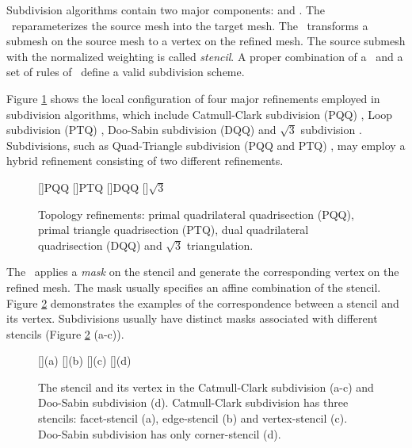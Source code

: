 Subdivision algorithms contain two major
components: \emph{\tr} and \emph{\gm}.
The \tr\ reparameterizes the source mesh into the target 
mesh. The \gm\ transforms a submesh on the source mesh
to a vertex on the refined mesh. The source submesh with
the normalized weighting is called 
\emph{stencil}. A proper combination of a \tr\ and a set of 
rules of \gm\ define a valid subdivision scheme.

Figure \ref{fig:RefSchemes} shows the local configuration 
of four major refinements
employed in subdivision algorithms, which include Catmull-Clark
subdivision (PQQ) \cite{cc}, Loop subdivision (PTQ) \cite{loop},
Doo-Sabin subdivision (DQQ) \cite{ds} and $\sqrt{3}$ subdivision
\cite{sqrt3}. Subdivisions, such as Quad-Triangle subdivision (PQQ and
PTQ) \cite{qts,l-pg-03}, may employ a hybrid refinement consisting
of two different refinements.
\begin{figure}
  \centering
  []{\scriptsize PQQ} 
  []{\scriptsize PTQ}
  []{\scriptsize DQQ} 
  []{\scriptsize $\sqrt{3}$} 
  \caption{Topology refinements: 
    primal quadrilateral quadrisection (PQQ),
    primal triangle quadrisection (PTQ),
    dual quadrilateral quadrisection (DQQ) and
    $\sqrt{3}$ triangulation.}
  \label{fig:RefSchemes}
\end{figure}
The \gm\ applies a \emph{mask} on the stencil and
generate the corresponding vertex on the refined mesh.
The mask usually specifies an affine combination of the 
stencil. Figure \ref{fig:RefMap} demonstrates the examples of the
correspondence between a stencil and its vertex. Subdivisions 
usually have distinct masks associated with different stencils 
(Figure \ref{fig:RefMap} (a-c)). 
\begin{figure}
  \centering
  []{(a)}
  []{(b)}
  []{(c)}
  []{(d)}
  \caption{The stencil and its vertex in the 
           Catmull-Clark subdivision (a-c)
	   and Doo-Sabin subdivision (d). Catmull-Clark
	   subdivision has three stencils: facet-stencil (a), 
	   edge-stencil (b) and vertex-stencil (c). 
	   Doo-Sabin subdivision has only corner-stencil (d).}
  \label{fig:RefMap}
\end{figure}




%

%


